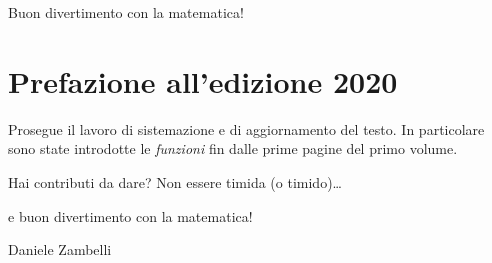 Buon divertimento con la matematica!

\section{Prefazione all'edizione 2020}
Prosegue il lavoro di sistemazione e di aggiornamento del testo.
In particolare sono state introdotte le \emph{funzioni} fin dalle prime 
pagine del primo volume.

Hai contributi da dare? Non essere timida (o timido)\dots

e buon divertimento con la matematica!
\begin{flushright}
Daniele Zambelli
\end{flushright}

